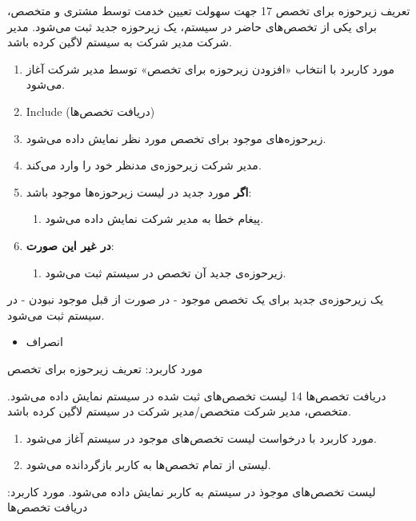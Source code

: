 {
	\usecase
	{تعریف زیرحوزه برای تخصص}
	{17}
	{جهت سهولت تعیین خدمت توسط مشتری و متخصص، برای یکی از تخصص‌های حاضر در سیستم، یک زیرحوزه جدید ثبت می‌شود.}
	{مدیر شرکت}
	{}
	{مدیر شرکت به سیستم لاگین کرده باشد.}
	{
		\vspace*{-0.6cm}
		\begin{enumerate}
			\item 
			مورد کاربرد با انتخاب «افزودن زیرحوزه برای تخصص» توسط مدیر شرکت آغاز می‌شود.
			\item Include (دریافت تخصص‌ها)
			\item زیرحوزه‌های موجود برای تخصص مورد نظر نمایش داده می‌شود.
			\item مدیر شرکت زیرحوزه‌ی مدنظر خود را وارد می‌کند. 
			\item
			\textbf{اگر}
			مورد جدید در لیست زیرحوزه‌ها موجود باشد:
			\begin{enumerate}[label=\theenumi.\arabic*.]
				\item پیغام خطا به مدیر شرکت نمایش داده می‌شود.
			\end{enumerate}
			\item
			\textbf{در غیر این صورت}:
			\begin{enumerate}[label=\theenumi.\arabic*.]
				\item زیرحوزه‌ی جدید آن تخصص در سیستم ثبت می‌شود.
			\end{enumerate}		
		\end{enumerate}
	}
	{یک زیرحوزه‌ی جدید برای یک تخصص موجود - در صورت از قبل موجود نبودن - در سیستم ثبت می‌شود.}
	{
		\begin{itemize}
			\vspace*{-0.6cm}
			\item انصراف
		\end{itemize}
	}
	{
		مورد کاربرد: تعریف زیرحوزه برای تخصص
	}
	
}







{
	\usecase
	{دریافت تخصص‌ها}
	{14}
	{لیست تخصص‌های ثبت شده در سیستم نمایش داده می‌شود.}
	{متخصص، مدیر شرکت}
	{}
	{متخصص/مدیر شرکت در سیستم لاگین کرده باشد.}
	{
		\vspace*{-0.6cm}
		\begin{enumerate}
			\item مورد کاربرد با درخواست لیست تخصص‌های موجود در سیستم آغاز می‌شود.
			\item لیستی از تمام تخصص‌ها به کاربر بازگردانده می‌شود.
		\end{enumerate}
	}
	{لیست تخصص‌های موجوذ در سیستم به کاربر نمایش داده می‌شود.}
	{
	}
	{
		مورد کاربرد: دریافت تخصص‌ها
	}
}


